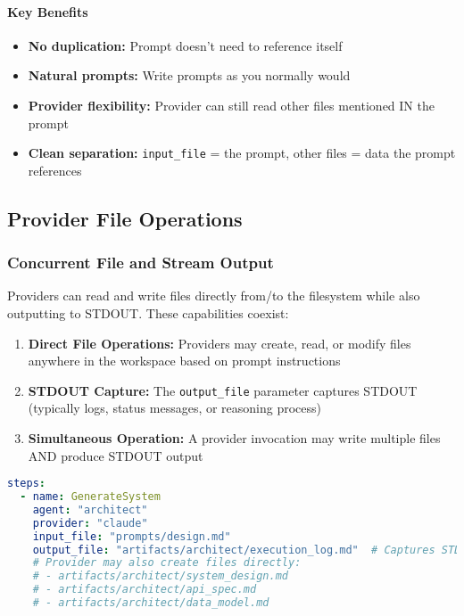 \documentclass[11pt,a4paper]{article}
\begin{document}
\paragraph{Key Benefits}
\begin{itemize}
    \item \textbf{No duplication:} Prompt doesn't need to reference itself
    \item \textbf{Natural prompts:} Write prompts as you normally would
    \item \textbf{Provider flexibility:} Provider can still read other files mentioned IN the prompt
    \item \textbf{Clean separation:} \texttt{input\_file} = the prompt, other files = data the prompt references
\end{itemize}

\subsection{Provider File Operations}

\subsubsection{Concurrent File and Stream Output}

Providers can read and write files directly from/to the filesystem while also outputting to STDOUT. These capabilities coexist:

\begin{enumerate}
    \item \textbf{Direct File Operations:} Providers may create, read, or modify files anywhere in the workspace based on prompt instructions
    \item \textbf{STDOUT Capture:} The \texttt{output\_file} parameter captures STDOUT (typically logs, status messages, or reasoning process)
    \item \textbf{Simultaneous Operation:} A provider invocation may write multiple files AND produce STDOUT output
\end{enumerate}

\begin{lstlisting}[language=yaml, caption={Provider File Operations Example}]
steps:
  - name: GenerateSystem
    agent: "architect"
    provider: "claude"
    input_file: "prompts/design.md"
    output_file: "artifacts/architect/execution_log.md"  # Captures STDOUT
    # Provider may also create files directly:
    # - artifacts/architect/system_design.md
    # - artifacts/architect/api_spec.md
    # - artifacts/architect/data_model.md
\end{lstlisting}
\end{document}
